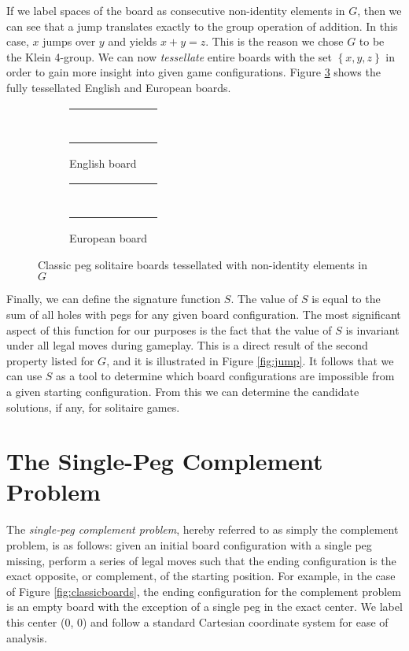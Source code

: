 \documentclass[11pt]{article}
\newcommand*\cir[1]{
  \begin{tikzpicture}[baseline]
    \node[draw,circle,inner sep=0pt,minimum size=12pt,anchor=center](C){#1};
  \end{tikzpicture}}
\newcommand*\x{\cir{$x$}}
\newcommand*\y{\cir{$y$}}
\newcommand*\z{\cir{$z$}}
\newcommand*\englishtessellatedstart{
\begin{tabular}{m{3pt} m{3pt} m{3pt} m{3pt} m{3pt} m{3pt} m{3pt}}
   &    & \x & \y & \z &    & \\
   &    & \y & \z & \x &    & \\
\x & \y & \z & \x & \y & \z & \x \\
\y & \z & \x & \y & \z & \x & \y \\
\z & \x & \y & \z & \x & \y & \z \\
   &    & \z & \x & \y &    & \\
   &    & \x & \y & \z &    & \\
\end{tabular}}
\newcommand*\europeantessellatedstart{
\begin{tabular}{m{3pt} m{3pt} m{3pt} m{3pt} m{3pt} m{3pt} m{3pt}}
   &    & \x & \y & \z &    & \\
   & \x & \y & \z & \x & \y & \\
\x & \y & \z & \x & \y & \z & \x \\
\y & \z & \x & \y & \z & \x & \y \\
\z & \x & \y & \z & \x & \y & \z \\
   & \y & \z & \x & \y & \z & \\
   &    & \x & \y & \z &    & \\
\end{tabular}}
\begin{document}
If we label spaces of the board as consecutive non-identity elements in $G$, then we can see that a jump translates exactly to the group operation of addition. In this case, $x$ jumps over $y$ and yields $x + y = z$. This is the reason we chose $G$ to be the Klein 4-group. We can now \emph{tessellate} entire boards with the set $\left\{x, y, z\right\}$ in order to gain more insight into given game configurations. Figure \ref{fig:classicboardstessellated} shows the fully tessellated English and European boards.

\begin{figure}[h]
\centering
\begin{subfigure}{.5\textwidth}
\centering
\englishtessellatedstart
\caption{English board}\label{subfig:classicboardstessellated:a}
\end{subfigure}%
\begin{subfigure}{.5\textwidth}
\centering
\europeantessellatedstart
\caption{European board}\label{subfig:classicboardstessellated:b}
\end{subfigure}
\caption{Classic peg solitaire boards tessellated with non-identity elements in $G$}
\label{fig:classicboardstessellated}
\end{figure}

Finally, we can define the signature function $S$. The value of $S$ is equal to the sum of all holes with pegs for any given board configuration. The most significant aspect of this function for our purposes is the fact that the value of $S$ is invariant under all legal moves during gameplay. This is a direct result of the second property listed for $G$, and it is illustrated in Figure \ref{fig:jump}. It follows that we can use $S$ as a tool to determine which board configurations are impossible from a given starting configuration. From this we can determine the candidate solutions, if any, for solitaire games.

\section{The Single-Peg Complement Problem}
The \emph{single-peg complement problem}, hereby referred to as simply the complement problem, is as follows: given an initial board configuration with a single peg missing, perform a series of legal moves such that the ending configuration is the exact opposite, or complement, of the starting position. For example, in the case of Figure \ref{fig:classicboards}, the ending configuration for the complement problem is an empty board with the exception of a single peg in the exact center. We label this center (0, 0) and follow a standard Cartesian coordinate system for ease of analysis.
\end{document}
